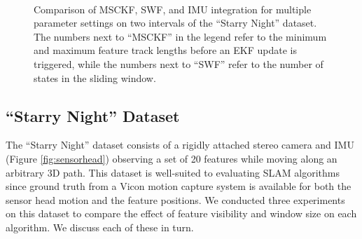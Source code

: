 \documentclass[letterpaper, 10 pt, conference]{ieeeconf}  %
\begin{document}
\begin{figure}
    \centering
    ~
    \caption{Comparison of MSCKF, SWF, and IMU integration for multiple parameter settings on two intervals of the ``Starry Night'' dataset. The numbers next to ``MSCKF'' in the legend refer to the minimum and maximum feature track lengths before an EKF update is triggered, while the numbers next to ``SWF'' refer to the number of states in the sliding window.}

    \vspace{-0.2cm}
\end{figure}

\subsection{``Starry Night'' Dataset}
The ``Starry Night'' dataset consists of a rigidly attached stereo camera and IMU (Figure \ref{fig:sensorhead}) observing a set of 20 features while moving along an arbitrary 3D path.
This dataset is well-suited to evaluating SLAM algorithms since ground truth from a Vicon motion capture system is available for both the sensor head motion and the feature positions.
We conducted three experiments on this dataset to compare the effect of feature visibility and window size on each algorithm.
We discuss each of these in turn.
\end{document}
